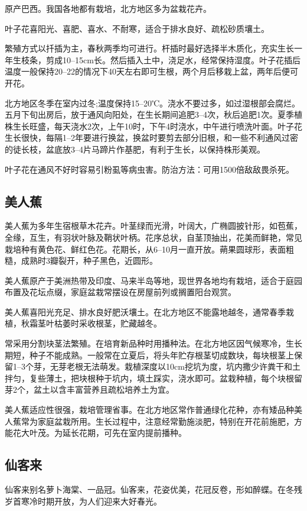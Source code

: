 \documentclass{ctexbook}
\begin{document}
原产巴西。我国各地都有栽培，北方地区多为盆栽花卉。

叶子花喜阳光、喜肥、喜水、不耐寒，适合于排水良好、疏松砂质壤土。

繁殖方式以扦插为主，春秋两季均可进行。杆插时最好选择半木质化，充实生长一年生枝条，剪成10--15cm长。然后插入土中，浇足水，经常保持湿度。叶子花插后温度一般保持20--22的情况下40天左右即可生根，两个月后移栽上盆，两年后便可开花。

北方地区冬季在室内过冬;温度保持15--20℃。浇水不要过多，如过湿根部会腐烂。五月下旬出房后，放于通风向阳处，在生长期间追肥3--4次，秋后追肥1次。夏季植株生长旺盛，每天浇水2次，上午10时，下午4时浇水，中午进行喷洗叶面。叶子花生长很快，每隔1--2年要进行换盆，换盆时要剪去部分旧根，和一些不利通风过密的徒长枝，盆底放3--4片马蹄片作基肥，有利于生长，以保持株形美观。

叶子花在通风不好时容易引粉虱等病虫害。防治方法：可用1500倍敌敌畏杀死。
\subsection{美人蕉}
美人蕉为多年生宿根草木花卉。叶茎绿而光滑，叶阔大，广椭圆披针形，如苞蕉，全缘，互生，有羽状叶脉及鞘状叶柄。花序总状，自茎顶抽出，花美而鲜艳，常见栽培种有黄色花、鲜红色花。花期长，从6--10月一直开放。蒴果圆球形，表面粗糙，成熟时3瓣裂开，种子黑色，近圆形。

美人蕉原产于美洲热带及印度、马来半岛等地，现世界各地均有栽培，适合于庭园布置及花坛点缀，家庭盆栽常摆设在房屋前列或搁置阳台观赏。

美人蕉喜阳光充足、排水良好肥沃壤土。在北方地区不能露地越冬，通常春季栽植，秋霜茎叶枯萎时采收根茎，贮藏越冬。

常采用分割块茎法繁殖。在培育新品种时用播种法。在北方地区因气候寒冷，生长期短，种子不能成熟。一般常在立夏后，将头年贮存根茎切成数块，每块根茎上保留1--3个芽，无芽老根无法萌发。栽植深度以10cm挖坑为度，坑内撒少许粪干和土拌匀，复些薄土，把块根种于坑内，填土踩实，浇水即可。盆栽种植，每个块根留芽2个，盆土以含丰富营养且疏松培养土为宜。

美人蕉适应性很强，栽培管理省事。在北方地区常作普通绿化花种，亦有矮品种美人蕉常为家庭盆栽所用。生长过程中，注意经常勤施淡肥，特别在开花前施肥，方能花大叶茂。为延长花期，可先在室内提前播种。
\subsection{仙客来}
仙客来别名萝卜海棠、一品冠。仙客来，花姿优美，花冠反卷，形如醉蝶。在冬残岁首寒冷时期开放，为人们迎来大好春光。
\end{document}
